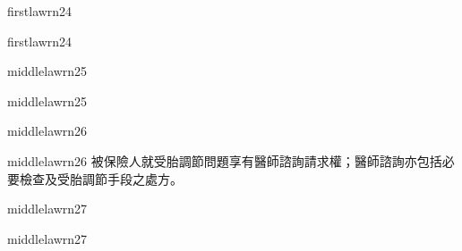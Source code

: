 \documentclass[12pt]{article}
\begin{document}
\begin{sourceboxpara}[title={原文理由 A.I.3 法條}]
\begin{lawboxpart}{first}{lawrn24}
\end{lawboxpart}
\end{sourceboxpara}
\begin{transboxpara}
\begin{lawboxpart}{first}{lawrn24}
\end{lawboxpart}
\end{transboxpara}
\begin{sourceboxpara}
\begin{lawboxpart}{middle}{lawrn25}
\end{lawboxpart}
\end{sourceboxpara}
\begin{transboxpara}
\begin{lawboxpart}{middle}{lawrn25}
\end{lawboxpart}
\end{transboxpara}
\begin{sourceboxpara}
\begin{lawboxpart}{middle}{lawrn26}
\end{lawboxpart}
\end{sourceboxpara}
\begin{transboxpara}
\begin{lawboxpart}{middle}{lawrn26}
被保險人就受胎調節問題享有醫師諮詢請求權；醫師諮詢亦包括必要檢查及受胎調節手段之處方。
\end{lawboxpart}
\end{transboxpara}
\begin{sourceboxpara}
\begin{lawboxpart}{middle}{lawrn27}
\end{lawboxpart}
\end{sourceboxpara}
\begin{transboxpara}
\begin{lawboxpart}{middle}{lawrn27}
\end{lawboxpart}
\end{transboxpara}
\end{document}
